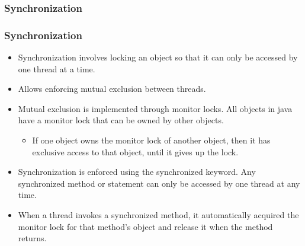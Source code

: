 \documentclass{beamer}
\begin{document}
\subsubsection{Synchronization}
\begin{frame}
\frametitle{Synchronization}
\begin{itemize}
\item {\color{orange} Synchronization} involves locking an object so that it can only be accessed by one thread at a time.
\item Allows enforcing {\color{red} mutual exclusion} between threads.
\item {\color{red} Mutual exclusion} is implemented through {\color{green} monitor locks}. All objects in java have a {\color{green} monitor lock} that can be owned by other objects.
\begin{itemize}
\item If one object owns the {\color{green} monitor lock} of another object, then it has exclusive access to that object, until it gives up the lock.
\end{itemize}
\item {\color{orange} Synchronization} is enforced using the {\color{purple} synchronized} keyword. Any {\color{purple} synchronized} method or statement can only be accessed by one thread at any time.
\item When a thread invokes a {\color{purple} synchronized} method, it automatically acquired the {\color{green} monitor lock} for that method's object and release it when the method returns.
\end{itemize}
\end{frame}

\end{document}
